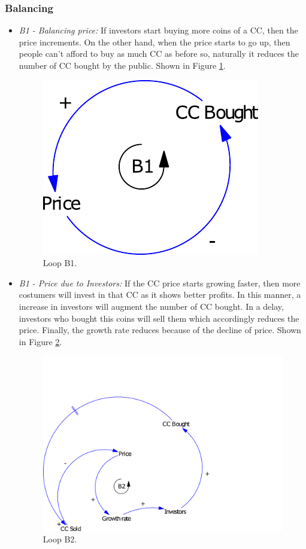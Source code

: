 \subsubsection{Balancing}
\begin{itemize}
	\item \textit{B1 - Balancing price:} If investors start buying more coins of a CC, then the price increments. On the other hand, when the price starts to go up, then people can't afford to buy as much CC as before so, naturally it reduces the number of CC bought by the public. Shown in Figure \ref{B1}.
	\begin{figure}[H]
		\centering
        \includegraphics[scale=0.6]{files/B1.pdf}
        \caption{Loop B1.}
        \label{B1}
	\end{figure}
    
	\item \textit{B1 - Price due to Investors:} If the CC price starts growing faster, then more costumers will invest in that CC as it shows better profits. In this manner, a increase in investors will augment the number of CC bought. In a delay, investors who bought this coins will sell them which accordingly reduces the price. Finally, the growth rate reduces because of the decline of price. Shown in Figure \ref{B2}.
	\begin{figure}[H]
		\centering
        \includegraphics[scale=0.5]{files/B2.pdf}
        \caption{Loop B2.}
        \label{B2}
	\end{figure}
\end{itemize}




